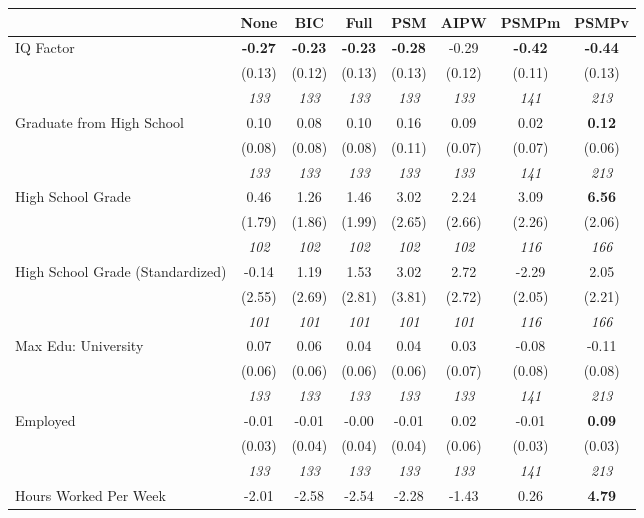 \begin{tabular}{l c c c c c c c}
\toprule
 & None & BIC & Full & PSM & AIPW & PSMPm & PSMPv \\
\midrule
IQ Factor & \textbf{ -0.27 } & \textbf{ -0.23 } & \textbf{ -0.23 } & \textbf{-0.28} & -0.29 & \textbf{-0.42} & \textbf{-0.44} \\
& (0.13) & (0.12) & (0.13) & (0.13) & (0.12) & (0.11) & (0.13) \\
& \textit{ 133 } & \textit{ 133 } & \textit{ 133 } & \textit{ 133 } & \textit{ 133 } & \textit{ 141 } & \textit{ 213 } \\
Graduate from High School & 0.10 & 0.08 & 0.10 & 0.16 & 0.09 & 0.02 & \textbf{0.12} \\
& (0.08) & (0.08) & (0.08) & (0.11) & (0.07) & (0.07) & (0.06) \\
& \textit{ 133 } & \textit{ 133 } & \textit{ 133 } & \textit{ 133 } & \textit{ 133 } & \textit{ 141 } & \textit{ 213 } \\
High School Grade & 0.46 & 1.26 & 1.46 & 3.02 & 2.24 & 3.09 & \textbf{6.56} \\
& (1.79) & (1.86) & (1.99) & (2.65) & (2.66) & (2.26) & (2.06) \\
& \textit{ 102 } & \textit{ 102 } & \textit{ 102 } & \textit{ 102 } & \textit{ 102 } & \textit{ 116 } & \textit{ 166 } \\
High School Grade (Standardized) & -0.14 & 1.19 & 1.53 & 3.02 & 2.72 & -2.29 & 2.05 \\
& (2.55) & (2.69) & (2.81) & (3.81) & (2.72) & (2.05) & (2.21) \\
& \textit{ 101 } & \textit{ 101 } & \textit{ 101 } & \textit{ 101 } & \textit{ 101 } & \textit{ 116 } & \textit{ 166 } \\
Max Edu: University & 0.07 & 0.06 & 0.04 & 0.04 & 0.03 & -0.08 & -0.11 \\
& (0.06) & (0.06) & (0.06) & (0.06) & (0.07) & (0.08) & (0.08) \\
& \textit{ 133 } & \textit{ 133 } & \textit{ 133 } & \textit{ 133 } & \textit{ 133 } & \textit{ 141 } & \textit{ 213 } \\
Employed & -0.01 & -0.01 & -0.00 & -0.01 & 0.02 & -0.01 & \textbf{0.09} \\
& (0.03) & (0.04) & (0.04) & (0.04) & (0.06) & (0.03) & (0.03) \\
& \textit{ 133 } & \textit{ 133 } & \textit{ 133 } & \textit{ 133 } & \textit{ 133 } & \textit{ 141 } & \textit{ 213 } \\
Hours Worked Per Week & -2.01 & -2.58 & -2.54 & -2.28 & -1.43 & 0.26 & \textbf{4.79} \\

\end{tabular}
